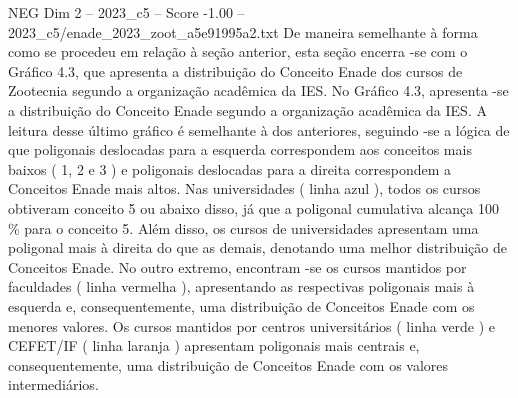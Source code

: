 \begin{textsample}{NEG Dim 2 – 2023\_c5 – Score -1.00 – 2023\_c5/enade\_2023\_zoot\_a5e91995a2.txt}
De maneira semelhante à forma como se procedeu em relação à seção anterior, esta seção encerra -se com o Gráfico 4.3, que apresenta a distribuição do Conceito Enade dos cursos de Zootecnia segundo a organização acadêmica da IES.
No Gráfico 4.3, apresenta -se a distribuição do Conceito Enade segundo a organização acadêmica da IES.
A leitura desse último gráfico é semelhante à dos anteriores, seguindo -se a lógica de que poligonais deslocadas para a esquerda correspondem aos conceitos mais baixos ( 1, 2 e 3 ) e poligonais deslocadas para a direita correspondem a Conceitos Enade mais altos.
Nas universidades ( linha azul ), todos os cursos obtiveram conceito 5 ou abaixo disso, já que a poligonal cumulativa alcança 100 \% para o conceito 5.
Além disso, os cursos de universidades apresentam uma poligonal mais à direita do que as demais, denotando uma melhor distribuição de Conceitos Enade.
No outro extremo, encontram -se os cursos mantidos por faculdades ( linha vermelha ), apresentando as respectivas poligonais mais à esquerda e, consequentemente, uma distribuição de Conceitos Enade com os menores valores.
Os cursos mantidos por centros universitários ( linha verde ) e CEFET/IF ( linha laranja ) apresentam poligonais mais centrais e, consequentemente, uma distribuição de Conceitos Enade com os valores intermediários.

\end{textsample}
